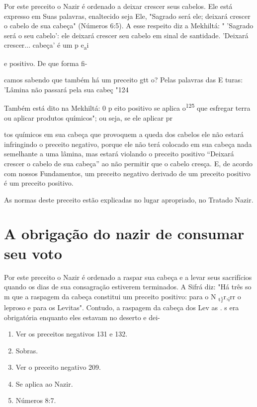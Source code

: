 Por este preceito o Nazir é ordenado a deixar crescer seus cabelos. Ele
está expresso em Suas palavras, enaltecido seja Ele, "Sagrado será ele;
dei­xará crescer o cabelo de sua cabeça" (Números 6:5). A esse respeito
diz a Mek­hiltá: " 'Sagrado será o seu cabelo': ele deixará crescer seu
cabelo em sinal de santidade. 'Deixará crescer... cabeça' é um p
e\textsubscript{a}i

e positivo. De que forma fi-

camos sabendo que também há um preceito gtt o? Pelas palavras das E
turas: 'Lâmina não passará pela sua cabeç "124

Também está dito na Mekhiltá: 0 p eito positivo se aplica
o\textsuperscript{125} que esfregar terra ou aplicar produtos químicos";
ou seja, se ele aplicar pr

tos químicos em sua cabeça que provoquem a queda dos cabelos ele não
estará infringindo o preceito negativo, porque ele não terá colocado em
sua cabeça nada semelhante a uma lâmina, mas estará violando o preceito
positivo ``Dei­xará crescer o cabelo de sua cabeça'' ao não permitir que o
cabelo cresça. E, de acordo com nossos Fundamentos, um preceito negativo
derivado de um pre­ceito positivo é um preceito positivo.

As normas deste preceito estão explicadas no lugar apropriado, no
Tratado Nazir.


\section{A obrigação do nazir de consumar seu voto}


Por este preceito o Nazir é ordenado a raspar sua cabeça e a levar seus
sacrifícios quando os dias de sua consagração estiverem terminados. A
Si­frá diz: "Há três so m que a raspagem da cabeça constitui um preceito
posi­tivo: para o N \textsubscript{t\}}r,\textsubscript{i}rr o leproso e
para os Levitas". Contudo, a raspagem da cabeça dos Lev as
. s era obrigatória enquanto eles estavam no deserto e
dei-


\begin{enumerate}
\def\labelenumi{\arabic{enumi}.}
\setcounter{enumi}{121}
\item
 
 Ver os preceitos negativos 131 e 132.
 
\item
 
 Sobras.
 
\item
 
 Ver o preceito negativo 209.
 
\item
 
 Se aplica ao Nazir.
 
\item
 
 Números 8:7.
 
\end{enumerate}

